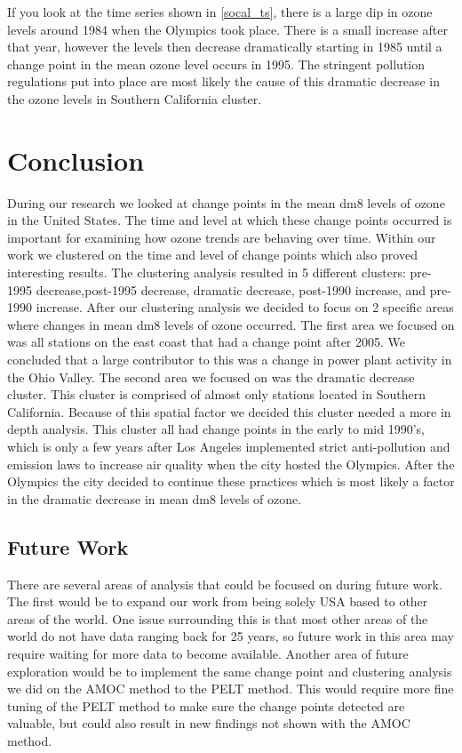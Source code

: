 \documentclass[11pt, oneside]{article}
\theoremstyle{definition}
\begin{document}
If you look at the time series shown in \ref{socal_ts}, there is a large dip in ozone levels around 1984 when the Olympics took place. There is a small increase after that year, however the levels then decrease dramatically starting in 1985 until a change point in the mean ozone level occurs in 1995. The stringent pollution regulations put into place are most likely the cause of this dramatic decrease in the ozone levels in Southern California cluster. 

\section{Conclusion}
During our research we looked at change points in the mean dm8 levels of ozone in the United States. The time and level at which these change points occurred is important for examining how ozone trends are behaving over time. Within our work we clustered on the time and level of change points which also proved interesting results. The clustering analysis resulted in 5 different clusters: pre-1995 decrease,post-1995 decrease, dramatic decrease, post-1990 increase, and pre-1990 increase. After our clustering analysis we decided to focus on 2 specific areas where changes in mean dm8 levels of ozone occurred. The first area we focused on was all stations on the east coast that had a change point after 2005. We concluded that a large contributor to this was a change in power plant activity in the Ohio Valley. The second area we focused on was the dramatic decrease cluster. This cluster is comprised of almost only stations located in Southern California. Because of this spatial factor we decided this cluster needed a more in depth analysis. This cluster all had change points in the early to mid 1990's, which is only a few years after Los Angeles implemented strict anti-pollution and emission laws to increase air quality when the city hosted the Olympics. After the Olympics the city decided to continue these practices which is most likely a factor in the dramatic decrease in mean dm8 levels of ozone. 


\subsection{Future Work}
There are several areas of analysis that could be focused on during future work. The first would be to expand our work from being solely USA based to other areas of the world. One issue surrounding this is that most other areas of the world do not have data ranging back for 25 years, so future work in this area may require waiting for more data to become available. Another area of future exploration would be to implement the same change point and clustering analysis we did on the AMOC method to the PELT method. This would require more fine tuning of the PELT method to make sure the change points detected are valuable, but could also result in new findings not shown with the AMOC method. 
\end{document}

